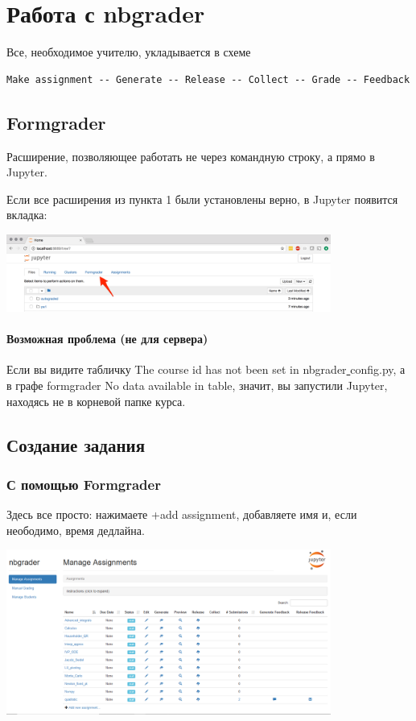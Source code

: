 \documentclass[a4paper,12pt]{article}
\begin{document}
\section{Работа с nbgrader}

Все, необходимое учителю, укладывается в схеме
\begin{verbatim}
Make assignment -- Generate -- Release -- Collect -- Grade -- Feedback
\end{verbatim}
\subsection{Formgrader}

Расширение, позволяющее работать не через командную строку, а прямо в Jupyter. 

Если все расширения из пункта 1 были установлены верно, в Jupyter появится вкладка:

\includegraphics[width=0.8\textwidth]{formgrader_tab}

\paragraph{Возможная проблема (не для сервера)}

Если вы видите табличку \grqq The course id has not been set in nbgrader\underline{ }config.py\grqq, а в графе formgrader \grqq No data available in table\grqq , значит, вы запустили Jupyter, находясь не в корневой папке курса.

\subsection{Создание задания}
\subsubsection{С помощью Formgrader}

Здесь все просто: нажимаете +add assignment, добавляете имя и, если неободимо, время дедлайна.

\includegraphics[width=0.8\textwidth]{formgrader_tab2}
\end{document}
